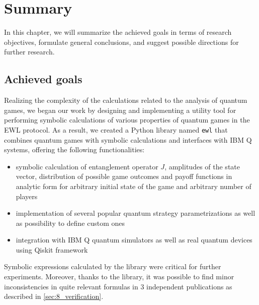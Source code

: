 \documentclass[../main.tex]{subfiles}
\begin{document}
\setcounter{chapter}{8}
\chapter{Summary}
\label{chap:9}

In this chapter, we will summarize the achieved goals in terms of research objectives, formulate general conclusions, and suggest possible directions for further research.

\section{Achieved goals}

Realizing the complexity of the calculations related to the analysis of quantum games, we began our work by designing and implementing a utility tool for performing symbolic calculations of various properties of quantum games in the EWL protocol. As a result, we created a Python library named \texttt{ewl} that combines quantum games with symbolic calculations and interfaces with IBM Q systems, offering the following functionalities:
\begin{itemize}
    \item symbolic calculation of entanglement operator $J$, amplitudes of the state vector,  distribution of possible game outcomes and payoff functions in analytic form for arbitrary initial state of the game and arbitrary number of players
    \item implementation of several popular quantum strategy parametrizations as well as possibility to define custom ones
    \item integration with IBM Q quantum simulators as well as real quantum devices using Qiskit framework
\end{itemize}
Symbolic expressions calculated by the library were critical for further experiments. Moreover, thanks to the library, it was possible to find minor inconsistencies in quite relevant formulas in 3 independent publications as described in \autoref{sec:8_verification}.
\end{document}
